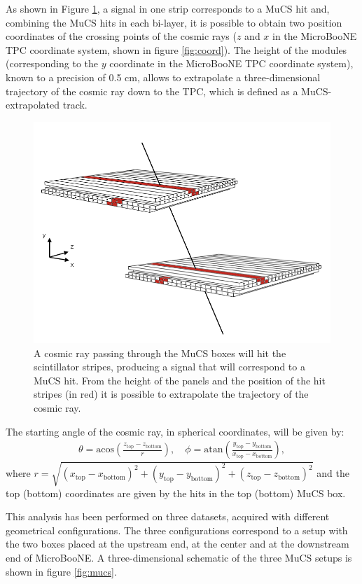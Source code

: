 \documentclass[a4paper,11pt]{article}
\begin{document}
As shown in Figure \ref{fig:boxes}, a signal in one strip corresponds to a MuCS hit and, combining the MuCS hits in each bi-layer, it is possible to obtain two position coordinates of the crossing points of the cosmic rays ($z$ and $x$ in the MicroBooNE TPC coordinate system, shown in figure \ref{fig:coord}). The height of the modules (corresponding to the $y$ coordinate in the MicroBooNE TPC coordinate system), known to a precision of 0.5 cm, allows to extrapolate a three-dimensional trajectory of the cosmic ray down to the TPC, which is defined as a MuCS-extrapolated track.
\begin{figure}[htbp]
  \begin{center}
    \includegraphics[width=0.7\linewidth]{figures/boxes.png}
    \caption{A cosmic ray passing through the MuCS boxes will hit the scintillator stripes, producing a signal that will correspond to a MuCS hit. From the height of the panels and the position of the hit stripes (in red) it is possible to extrapolate the trajectory of the cosmic ray.} \label{fig:boxes}
  \end{center}
\end{figure}

The starting angle of the cosmic ray, in spherical coordinates, will be given by:
\begin{align}\label{eq:angles}
  \theta = \mathrm{acos}\left(\frac{z_{\mathrm{top}}-z_{\mathrm{bottom}}}{r}\right), \quad
  \phi = \mathrm{atan}\left(\frac{y_{\mathrm{top}}-y_{\mathrm{bottom}}}{x_{\mathrm{top}}-x_{\mathrm{bottom}}}\right),
\end{align}
where $r = \sqrt{(x_{\mathrm{top}}-x_{\mathrm{bottom}})^2+(y_{\mathrm{top}}-y_{\mathrm{bottom}})^2+(z_{\mathrm{top}}-z_{\mathrm{bottom}})^2}$ and the top (bottom) coordinates are given by the hits in the top (bottom) MuCS box.


This analysis has been performed on three datasets, acquired with different geometrical configurations. The three configurations correspond to a setup with the two boxes placed at the upstream end, at the center and at the downstream end of MicroBooNE.
A three-dimensional schematic of the three MuCS setups is shown in figure \ref{fig:mucs}.
\end{document}
